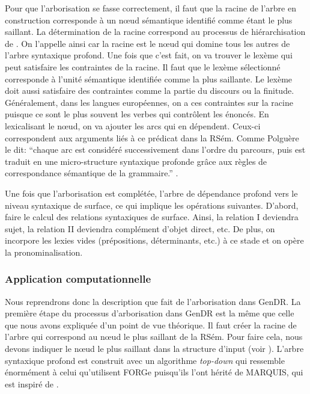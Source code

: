 Pour que l'arborisation se fasse correctement, il faut que la racine de l'arbre en construction corresponde à un n\oe{}ud sémantique identifié comme étant le plus saillant. La détermination de la racine correspond au processus de hiérarchisation de \cite{PolguereStructurationmisejeu1990}. On l'appelle ainsi car la racine est le n\oe{}ud qui domine tous les autres de l'arbre syntaxique profond. Une fois que c'est fait, on va trouver le lexème qui peut satisfaire les contraintes de la racine. Il faut que le lexème sélectionné corresponde à l'unité sémantique identifiée comme la plus saillante. Le lexème doit aussi satisfaire des contraintes comme la partie du discours ou la finitude. Généralement, dans les langues européennes, on a ces contraintes sur la racine puisque ce sont le plus souvent les verbes qui contrôlent les énoncés. En lexicalisant le n\oe{}ud, on va  ajouter les arcs qui en dépendent. Ceux-ci correspondent aux arguments liés à ce prédicat dans la RSém. Comme Polguère le dit: ``chaque arc est considéré successivement dans l'ordre du parcours, puis est traduit en une micro-structure syntaxique profonde grâce aux règles de correspondance sémantique de la grammaire.'' \citep[p.~273]{PolguereStructurationmisejeu1990}.

Une fois que l'arborisation est complétée, l'arbre de dépendance profond  vers le niveau syntaxique de surface, ce qui implique les opérations suivantes. D'abord, faire le calcul des relations syntaxiques de surface. Ainsi, la relation I deviendra sujet, la relation II deviendra complément d'objet direct, etc. De plus, on incorpore les lexies vides (prépositions, déterminants, etc.) à ce stade et on opère la pronominalisation.


\subsubsection{Application computationnelle}

Nous reprendrons donc la description que \cite{lareau18} fait de l'arborisation dans GenDR. La première étape du processus d'arborisation dans GenDR est la même que celle que nous avons expliquée d'un point de vue théorique. Il faut créer la racine de l'arbre qui correspond au n\oe{}ud le plus saillant de la RSém. Pour faire cela, nous devons indiquer le n\oe{}ud le plus saillant dans la structure d'input (voir ). L'arbre syntaxique profond est construit avec un algorithme \emph{top-down} qui ressemble énormément à celui qu'utilisent FORGe puisqu'ils l'ont hérité de MARQUIS, qui est inspiré de \cite{PolguereStructurationmisejeu1990}.

